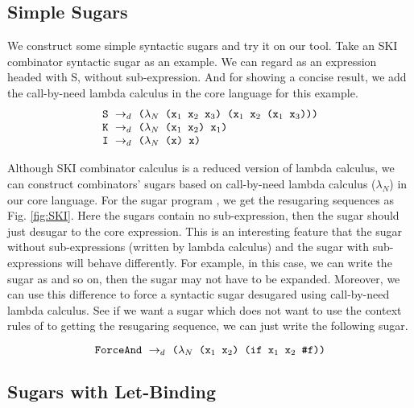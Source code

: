 \subsection{Simple Sugars}
\label{mark:simple}

We construct some simple syntactic sugars and try it on our tool. 
Take an SKI combinator syntactic sugar as an example. We can regard  as an expression headed with S, without sub-expression. And for showing a concise result, we add the call-by-need lambda calculus in the core language for this example.
\[
\begin{array}{l}
\mbox{\tt S} ~\rightarrow_d~ \texttt{($\lambda_N$ ($\mbox{\tt x}_1$ $\mbox{\tt x}_2$ $\mbox{\tt x}_3$) ($\mbox{\tt x}_1$ $\mbox{\tt x}_2$ ($\mbox{\tt x}_1$ $\mbox{\tt x}_3$)))}\\
\mbox{\tt K} ~\rightarrow_d~ \texttt{($\lambda_N$ ($\mbox{\tt x}_1$ $\mbox{\tt x}_2$) $\mbox{\tt x}_1$)}\\
\mbox{\tt I} ~\rightarrow_d~ \texttt{($\lambda_N$ (x) x)}
\end{array}
\]




Although SKI combinator calculus is a reduced version of lambda calculus, we can construct combinators' sugars based on call-by-need lambda calculus ($\lambda_N$) in our core language. For the sugar program , we get the resugaring sequences as Fig.  \ref{fig:SKI}. Here the sugars contain no sub-expression, then the sugar should just desugar to the core expression. This is an interesting feature that the sugar without sub-expressions (written by lambda calculus) and the sugar with sub-expressions will behave differently. For example, in this case, we can write the sugar as  and so on, then the sugar may not have to be expanded. Moreover, we can use this difference to force a syntactic sugar desugared using call-by-need lambda calculus. See if we want a sugar  which does not want to use the context rules of  to getting the resugaring sequence, we can just write the following sugar.

\[
\texttt{ForceAnd} ~\rightarrow_d~ \texttt{($\lambda_N$ ($\mbox{\tt x}_1$ $\mbox{\tt x}_2$) (if $\mbox{\tt x}_1$ $\mbox{\tt x}_2$ \#f))}
\]






\subsection{Sugars with Let-Binding}
\label{mark:hygienic}


